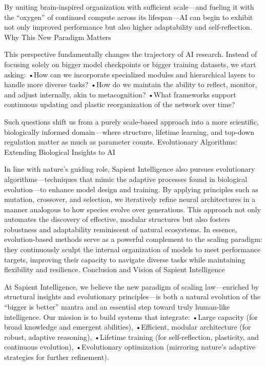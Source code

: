 By uniting brain-inspired organization with sufficient scale—and fueling it with the “oxygen” of continued compute across its lifespan—AI can begin to exhibit not only improved performance but also higher adaptability and self-reflection.
Why This New Paradigm Matters

This perspective fundamentally changes the trajectory of AI research. Instead of focusing solely on bigger model checkpoints or bigger training datasets, we start asking:
•How can we incorporate specialized modules and hierarchical layers to handle more diverse tasks?
•How do we maintain the ability to reflect, monitor, and adjust internally, akin to metacognition?
•What frameworks support continuous updating and plastic reorganization of the network over time?

Such questions shift us from a purely scale-based approach into a more scientific, biologically informed domain—where structure, lifetime learning, and top-down regulation matter as much as parameter counts.
Evolutionary Algorithms: Extending Biological Insights to AI

In line with nature’s guiding role, Sapient Intelligence also pursues evolutionary algorithms—techniques that mimic the adaptive processes found in biological evolution—to enhance model design and training. By applying principles such as mutation, crossover, and selection, we iteratively refine neural architectures in a manner analogous to how species evolve over generations. This approach not only automates the discovery of effective, modular structures but also fosters robustness and adaptability reminiscent of natural ecosystems. In essence, evolution-based methods serve as a powerful complement to the scaling paradigm: they continuously sculpt the internal organization of models to meet performance targets, improving their capacity to navigate diverse tasks while maintaining flexibility and resilience.
Conclusion and Vision of Sapient Intelligence

At Sapient Intelligence, we believe the new paradigm of scaling law—enriched by structural insights and evolutionary principles—is both a natural evolution of the “bigger is better” mantra and an essential step toward truly human-like intelligence. Our mission is to build systems that integrate:
•Large capacity (for broad knowledge and emergent abilities),
•Efficient, modular architecture (for robust, adaptive reasoning),
•Lifetime training (for self-reflection, plasticity, and continuous evolution),
•Evolutionary optimization (mirroring nature’s adaptive strategies for further refinement).


